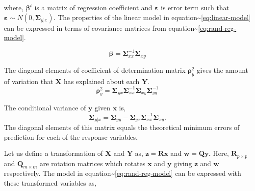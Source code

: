 \documentclass[12pt,A4paper,authoryear]{elsarticle} %
\providecommand{\tightlist}{%
  \setlength{\itemsep}{0pt}\setlength{\parskip}{0pt}}
\theoremstyle{definition}
\theoremstyle{definition}
\theoremstyle{remark}
\begin{document}
where, \(\boldsymbol{\beta}^t\) is a matrix of regression coefficient
and \(\boldsymbol{\varepsilon}\) is error term such that
\(\boldsymbol{\varepsilon} \sim N\left(0, \boldsymbol{\Sigma}_{y|x}\right)\).
The properties of the linear model in
equation\textasciitilde{}\eqref{eq:linear-model} can be expressed in terms
of covariance matrices from
equation\textasciitilde{}\eqref{eq:rand-reg-model}.

\begin{description}
\tightlist
\item[Regression Coefficients]
\[ \boldsymbol{\beta} = \boldsymbol{\Sigma}_{xx}^{-1}\boldsymbol{\Sigma}_{xy}\]
\item[Coefficient of Determination \(\boldsymbol{\rho}_y^2\)]
The diagonal elements of coefficient of determination matrix
\(\boldsymbol{\rho}_y^2\) gives the amount of variation that
\(\mathbf{X}\) has explained about each \(\mathbf{Y}\).
\[\boldsymbol{\rho}_y^2 = \boldsymbol{\Sigma}_{yx}\boldsymbol{\Sigma}_{xx}^{-1}\boldsymbol{\Sigma}_{xy}\boldsymbol{\Sigma}_{yy}^{-1}\]
\item[Conditional variance]
The conditional variance of \(\mathbf{y}\) given \(\mathbf{x}\) is,
\[\boldsymbol{\Sigma}_{y|x} = \boldsymbol{\Sigma}_{yy} - \boldsymbol{\Sigma}_{yx}\boldsymbol{\Sigma}_{xx}^{-1}\boldsymbol{\Sigma}_{xy}.\]
The diagonal elements of this matrix equals the theoretical minimum
errors of prediction for each of the response variables.
\end{description}

Let us define a transformation of \(\mathbf{X}\) and \(\mathbf{Y}\) as,
\(\mathbf{z} = \mathbf{Rx}\) and \(\mathbf{w} = \mathbf{Qy}\). Here,
\(\mathbf{R}_{p\times p}\) and \(\mathbf{Q}_{m\times m}\) are rotation
matrices which rotates \(\mathbf{x}\) and \(\mathbf{y}\) giving
\(\mathbf{z}\) and \(\mathbf{w}\) respectively. The model in
equation\textasciitilde{}\eqref{eq:rand-reg-model} can be expressed with
these transformed variables as,
\end{document}
